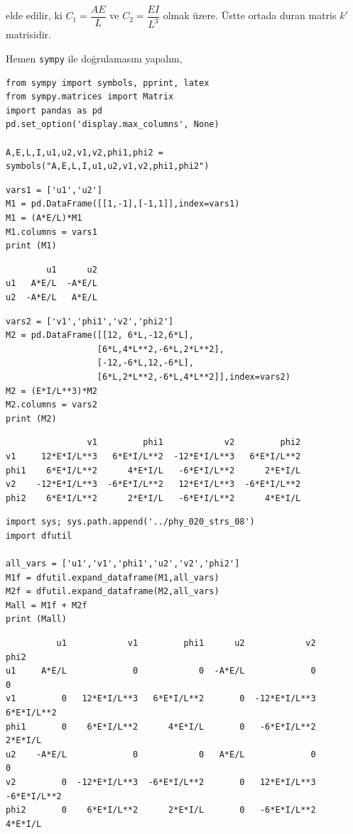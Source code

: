 \documentclass[12pt,fleqn]{article}\usepackage{../../common}
\begin{document}
elde edilir, ki $C_1 = \dfrac{AE}{L}$ ve $C_2 = \dfrac{EI}{L^3}$
olmak üzere. Üstte ortada duran matris $k'$ matrisidir.

Hemen \verb!sympy! ile doğrulamasını yapalım,

\begin{verbatim}
from sympy import symbols, pprint, latex
from sympy.matrices import Matrix
import pandas as pd
pd.set_option('display.max_columns', None)

A,E,L,I,u1,u2,v1,v2,phi1,phi2 = symbols("A,E,L,I,u1,u2,v1,v2,phi1,phi2")
\end{verbatim}

\begin{verbatim}
vars1 = ['u1','u2']
M1 = pd.DataFrame([[1,-1],[-1,1]],index=vars1)
M1 = (A*E/L)*M1
M1.columns = vars1
print (M1)
\end{verbatim}

\begin{verbatim}
        u1      u2
u1   A*E/L  -A*E/L
u2  -A*E/L   A*E/L
\end{verbatim}

\begin{verbatim}
vars2 = ['v1','phi1','v2','phi2']
M2 = pd.DataFrame([[12, 6*L,-12,6*L],
                  [6*L,4*L**2,-6*L,2*L**2],
                  [-12,-6*L,12,-6*L],
                  [6*L,2*L**2,-6*L,4*L**2]],index=vars2)
M2 = (E*I/L**3)*M2
M2.columns = vars2
print (M2)
\end{verbatim}

\begin{verbatim}
                v1         phi1            v2         phi2
v1     12*E*I/L**3   6*E*I/L**2  -12*E*I/L**3   6*E*I/L**2
phi1    6*E*I/L**2      4*E*I/L   -6*E*I/L**2      2*E*I/L
v2    -12*E*I/L**3  -6*E*I/L**2   12*E*I/L**3  -6*E*I/L**2
phi2    6*E*I/L**2      2*E*I/L   -6*E*I/L**2      4*E*I/L
\end{verbatim}

\begin{verbatim}
import sys; sys.path.append('../phy_020_strs_08')
import dfutil

all_vars = ['u1','v1','phi1','u2','v2','phi2']
M1f = dfutil.expand_dataframe(M1,all_vars)
M2f = dfutil.expand_dataframe(M2,all_vars)
Mall = M1f + M2f
print (Mall)
\end{verbatim}

\begin{verbatim}
          u1            v1         phi1      u2            v2         phi2
u1     A*E/L             0            0  -A*E/L             0            0
v1         0   12*E*I/L**3   6*E*I/L**2       0  -12*E*I/L**3   6*E*I/L**2
phi1       0    6*E*I/L**2      4*E*I/L       0   -6*E*I/L**2      2*E*I/L
u2    -A*E/L             0            0   A*E/L             0            0
v2         0  -12*E*I/L**3  -6*E*I/L**2       0   12*E*I/L**3  -6*E*I/L**2
phi2       0    6*E*I/L**2      2*E*I/L       0   -6*E*I/L**2      4*E*I/L
\end{verbatim}
\end{document}

